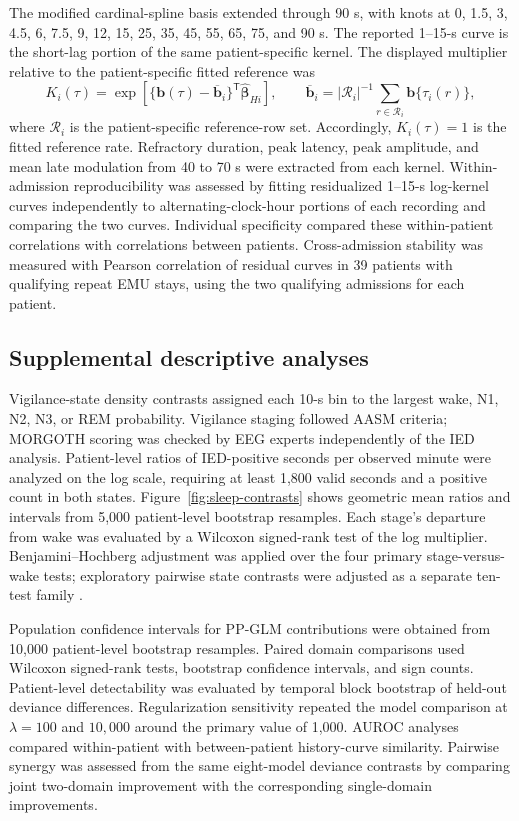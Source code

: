 \documentclass[11pt]{article}
\begin{document}
The modified cardinal-spline basis extended through 90 s, with knots at 0, 1.5, 3, 4.5, 6, 7.5, 9, 12, 15, 25, 35, 45, 55, 65, 75, and 90 s. The reported 1--15-s curve is the short-lag portion of the same patient-specific kernel. The displayed multiplier relative to the patient-specific fitted reference was
\begin{equation}
K_i(\tau)=\exp\!\left[\{\bm b(\tau)-\overline{\bm b}_i\}^{\mathsf T}\widehat{\bm\beta}_{Hi}\right],\qquad
\overline{\bm b}_i=|\mathcal R_i|^{-1}\sum_{r\in\mathcal R_i}\bm b\{\tau_i(r)\},
\label{eq:multiplier}
\end{equation}
where $\mathcal R_i$ is the patient-specific reference-row set. Accordingly, $K_i(\tau)=1$ is the fitted reference rate. Refractory duration, peak latency, peak amplitude, and mean late modulation from 40 to 70 s were extracted from each kernel. Within-admission reproducibility was assessed by fitting residualized 1--15-s log-kernel curves independently to alternating-clock-hour portions of each recording and comparing the two curves. Individual specificity compared these within-patient correlations with correlations between patients. Cross-admission stability was measured with Pearson correlation of residual curves in 39 patients with qualifying repeat EMU stays, using the two qualifying admissions for each patient.

\subsection*{Supplemental descriptive analyses}

Vigilance-state density contrasts assigned each 10-s bin to the largest wake, N1, N2, N3, or REM probability. Vigilance staging followed AASM criteria; MORGOTH scoring was checked by EEG experts independently of the IED analysis. Patient-level ratios of IED-positive seconds per observed minute were analyzed on the log scale, requiring at least 1,800 valid seconds and a positive count in both states. Figure~\ref{fig:sleep-contrasts} shows geometric mean ratios and intervals from 5,000 patient-level bootstrap resamples. Each stage's departure from wake was evaluated by a Wilcoxon signed-rank test of the log multiplier. Benjamini--Hochberg adjustment was applied over the four primary stage-versus-wake tests; exploratory pairwise state contrasts were adjusted as a separate ten-test family \cite{Benjamini1995}.

Population confidence intervals for PP-GLM contributions were obtained from 10,000 patient-level bootstrap resamples. Paired domain comparisons used Wilcoxon signed-rank tests, bootstrap confidence intervals, and sign counts. Patient-level detectability was evaluated by temporal block bootstrap of held-out deviance differences. Regularization sensitivity repeated the model comparison at $\lambda=100$ and $10{,}000$ around the primary value of 1,000. AUROC analyses compared within-patient with between-patient history-curve similarity. Pairwise synergy was assessed from the same eight-model deviance contrasts by comparing joint two-domain improvement with the corresponding single-domain improvements.
\end{document}

